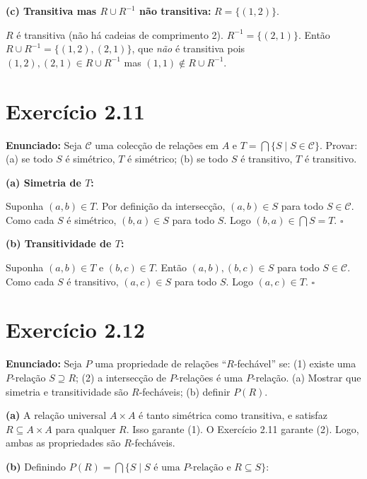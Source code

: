 \documentclass[12pt,a4paper]{article}
\begin{document}
\textbf{(c) Transitiva mas $R \cup R^{-1}$ não transitiva:} $R = \{(1,2)\}$.

$R$ é transitiva (não há cadeias de comprimento 2). $R^{-1} = \{(2,1)\}$. Então $R \cup R^{-1} = \{(1,2),(2,1)\}$, que \emph{não} é transitiva pois $(1,2),(2,1) \in R \cup R^{-1}$ mas $(1,1) \notin R \cup R^{-1}$.

\section*{Exercício 2.11}

\textbf{Enunciado:} Seja $\mathcal{C}$ uma colecção de relações em $A$ e $T = \bigcap \{S \mid S \in \mathcal{C}\}$. Provar: (a) se todo $S$ é simétrico, $T$ é simétrico; (b) se todo $S$ é transitivo, $T$ é transitivo.

\textbf{(a) Simetria de $T$:}

Suponha $(a,b) \in T$. Por definição da intersecção, $(a,b) \in S$ para todo $S \in \mathcal{C}$. Como cada $S$ é simétrico, $(b,a) \in S$ para todo $S$. Logo $(b,a) \in \bigcap S = T$. \hfill$\square$

\textbf{(b) Transitividade de $T$:}

Suponha $(a,b) \in T$ e $(b,c) \in T$. Então $(a,b),(b,c) \in S$ para todo $S \in \mathcal{C}$. Como cada $S$ é transitivo, $(a,c) \in S$ para todo $S$. Logo $(a,c) \in T$. \hfill$\square$

\section*{Exercício 2.12}

\textbf{Enunciado:} Seja $P$ uma propriedade de relações ``$R$-fechável'' se: (1) existe uma $P$-relação $S \supseteq R$; (2) a intersecção de $P$-relações é uma $P$-relação. (a) Mostrar que simetria e transitividade são $R$-fecháveis; (b) definir $P(R)$.

\textbf{(a)} A relação universal $A \times A$ é tanto simétrica como transitiva, e satisfaz $R \subseteq A \times A$ para qualquer $R$. Isso garante (1). O Exercício 2.11 garante (2). Logo, ambas as propriedades são $R$-fecháveis.

\textbf{(b)} Definindo $P(R) = \bigcap \{S \mid S \text{ é uma } P\text{-relação e } R \subseteq S\}$:
\end{document}
